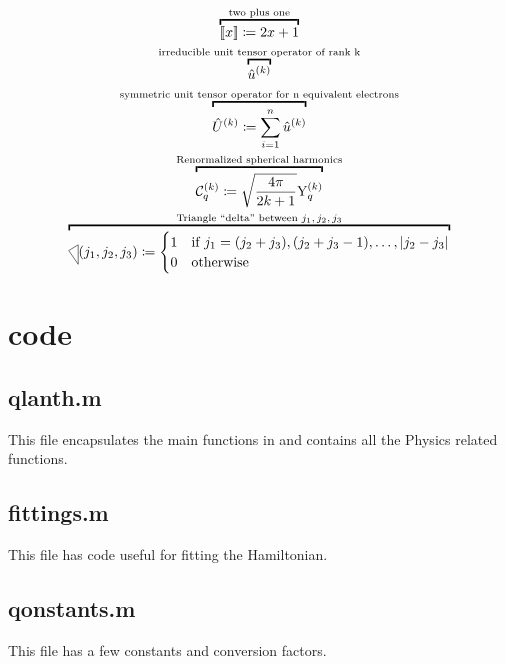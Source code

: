 \documentclass{article}
\begin{document}
\begin{gather} 
    \overbracket{\tpobraket{x} \DEF 2x+1}^{\text{two plus one}} \\
    \overbracket{\op{u}^{(k)}}^{\text{irreducible unit tensor operator of rank k}} \\ 
    \overbracket{\op{U}^{(k)} \DEF \sum_{i=1}^{n} \op{u}^{(k)} }^{\text{symmetric unit tensor operator for n equivalent electrons}} \\
    \overbracket{\Ckq{k}{q} \DEF \sqrt{\frac{4\pi}{2k+1}} \Ykq}^{\text{Renormalized spherical harmonics}} \\
    \overbracket{\tricondition{j_1,j_2,j_3} \DEF
    \begin{cases} 
        1 & \text{if } j_1 = (j_2 + j_3), (j_2 + j_3 - 1), \ldots, |j_2-j_3|\\
        0 & \text{otherwise}
        \end{cases}}^{\text{Triangle ``delta'' between $j_1,j_2,j_3$}} 
\end{gather}

\newpage

\section{code}

\subsection{qlanth.m}

This file encapsulates the main functions in \qlanth and contains all the Physics related functions.



\subsection{fittings.m} 

This file has code useful for fitting the Hamiltonian.



\subsection{qonstants.m} 

This file has a few constants and conversion factors.


\end{document}
